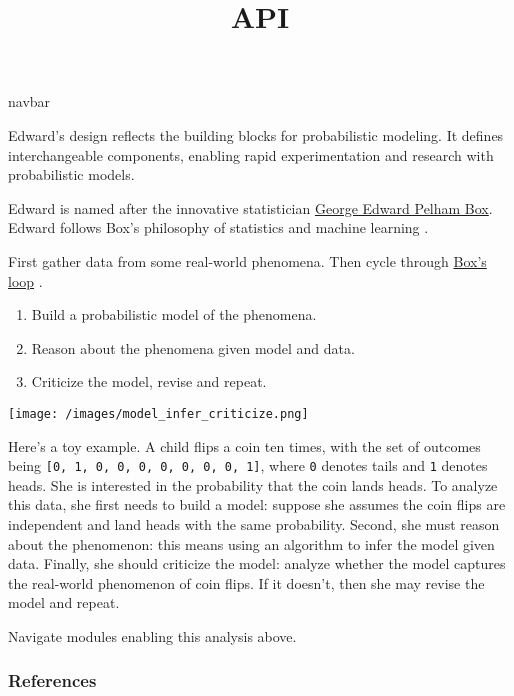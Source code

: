 \title{API}

{{navbar}}

Edward's design reflects the building blocks for probabilistic
modeling. It defines interchangeable components, enabling rapid
experimentation and research with probabilistic models.

Edward is named after the innovative statistician
\href{https://en.wikipedia.org/wiki/George_E._P._Box}{George Edward
Pelham Box}. Edward follows Box's philosophy of statistics and machine
learning \citep{box1976science}.

First gather data from some real-world phenomena. Then cycle through
\href{http://www.annualreviews.org/eprint/7xbyci3nwAg5kEttvvjk/full/10.1146/annurev-statistics-022513-115657}
{Box's loop} \citep{blei2014build}.

\begin{enumerate}
\item Build a probabilistic model of the phenomena.
\item Reason about the phenomena given model and data.
\item Criticize the model, revise and repeat.
\end{enumerate}

\texttt{[image: /images/model\_infer\_criticize.png]}

Here's a toy example. A child flips a coin ten times, with the set of outcomes
being \texttt{{[}0,\ 1,\ 0,\ 0,\ 0,\ 0,\ 0,\ 0,\ 0,\ 1{]}}, where \texttt{0}
denotes tails and \texttt{1} denotes heads. She is interested in the probability
that the coin lands heads. To analyze this data, she first needs to build a
model: suppose she assumes the coin flips are independent and land heads with
the same probability. Second, she must reason about the phenomenon: this
means using an algorithm to infer the model given data. Finally, she should
criticize the model: analyze whether the model captures the real-world
phenomenon of coin flips. If it doesn't, then she may revise the model and
repeat.

Navigate modules enabling this analysis above.

\subsubsection{References}\label{references}
